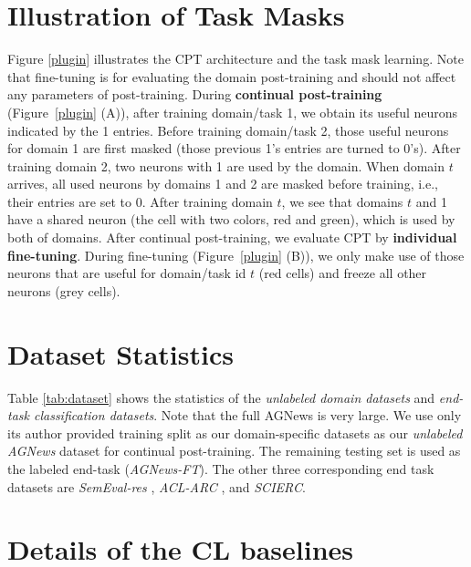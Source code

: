 \documentclass[11pt]{article}
\begin{document}
\section{Illustration of Task Masks}
\label{sec.illustration}
Figure \ref{plugin} illustrates the CPT architecture and the task mask learning. Note that fine-tuning is for evaluating the domain post-training and should not affect any parameters of post-training. 
During \textbf{continual post-training} (Figure~\ref{plugin} (A)), after training domain/task 1, we obtain its useful neurons indicated by the 1 entries. Before training domain/task 2, those useful neurons for domain 1 are first masked (those previous 1's entries are turned to 0's). After training domain 2, two neurons with 1 are used by the domain. When domain $t$ arrives, all used neurons by domains 1 and 2 are masked before training, i.e., their entries are set to 0. After training domain $t$, we see that domains $t$ and 1 have a shared neuron (the cell with two colors, red and green), which is used by both of domains. After continual post-training, we evaluate CPT by \textbf{individual fine-tuning}. During fine-tuning (Figure~\ref{plugin} (B)), we only make use of those neurons that are useful for domain/task id $t$ (red cells) and freeze all other neurons (grey cells).

\section{Dataset Statistics}
\label{sec:data_stat}


Table \ref{tab:dataset} shows the statistics of the \textit{unlabeled domain datasets} and \textit{end-task classification datasets}.
Note that the full AGNews is very large. We use only its author provided training split as our domain-specific datasets as our \textit{unlabeled AGNews} dataset for continual post-training. The remaining testing set is used as the labeled end-task (\textit{AGNews-FT}). The other three corresponding end task datasets are \textit{SemEval-res} \cite{DBLP:conf/naacl/XuLSY19}, \textit{ACL-ARC} \cite{DBLP:journals/tacl/JurgensKHMJ18}, and \textit{SCIERC}\cite{DBLP:conf/emnlp/LuanHOH18}. 



\section{Details of the CL baselines}
\label{ap:baselines}
\end{document}
